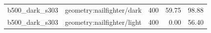 \begin{longtable}{l>{\raggedright\arraybackslash}p{.42\linewidth}rrr}
b500\_\allowbreak{}dark\_\allowbreak{}s303 & %
geometry:nailfighter/dark & %
400 & %
59.75 & %
98.88 \\ %

b500\_\allowbreak{}dark\_\allowbreak{}s303 & %
geometry:nailfighter/light & %
400 & %
0.00 & %
56.40 \\ %


\end{longtable}
